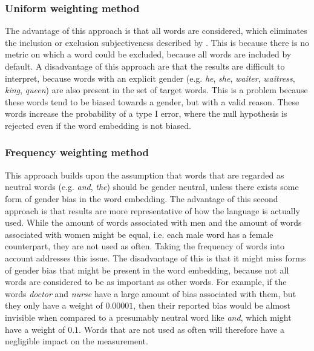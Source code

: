 \subsubsection{Uniform weighting method} \label{section:discussion_uniform_method}
The advantage of this approach is
that all words are considered, which eliminates the inclusion or exclusion subjectiveness
described by \textcite{nissim_fair_is_better_2020}.  This is because there is no metric
on which a word could be excluded, because all words are included by default.
A disadvantage of this approach
are that the results are difficult to interpret, because words with an explicit
gender (e.g. \textit{he}, \textit{she}, \textit{waiter}, \textit{waitress},
\textit{king}, \textit{queen}) are also
present in the set of target words. This is a problem because these words tend to be biased
towards a gender, but with a valid reason. These words increase the probability of a
type I error, where the null hypothesis is rejected even if the word embedding is not
biased.

\subsubsection{Frequency weighting method} \label{section:discussion_frequency_method}
This approach builds upon the assumption that words that are regarded as neutral words
(e.g. \textit{and}, \textit{the}) should be gender neutral, unless there exists some form
of gender bias in the word embedding.
The advantage of this second approach is that results are more representative of how
the language is actually used. While the amount of words associated with men and the
amount of words associated with women might be equal, i.e. each male word has a female
counterpart, they are not used as often.
Taking the frequency of words into account addresses this issue. 
The disadvantage of this is that
it might miss forms of gender bias that might be present in the word embedding, because
not all words are considered to be as important as other words. For example, if the words
\textit{doctor} and \textit{nurse} have a large amount of bias associated with them,
but they only have a weight of $0.00001$, then their reported bias would be almost
invisible when compared to a presumably neutral word like \textit{and}, which might have
a weight of $0.1$. Words that are not used as often will therefore have a negligible impact
on the measurement.






